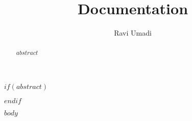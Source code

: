\documentclass{article}
\title{Documentation}
\author{Ravi Umadi}
\date{}
\begin{document}
\maketitle
\newpage


$if(abstract)$
\begin{abstract}
$abstract$
\end{abstract}
$endif$

$body$
\end{document}
